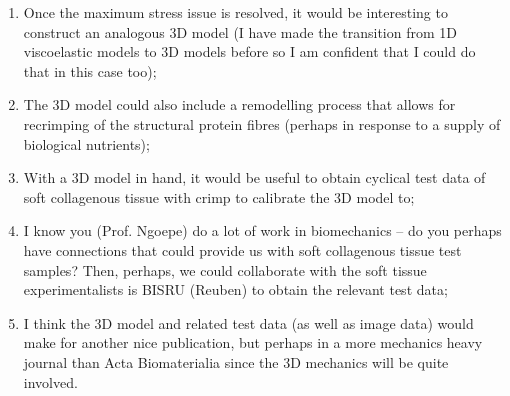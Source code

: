 \documentclass{article}
\begin{document}
\begin{enumerate}
	\item Once the maximum stress issue is resolved, it would be interesting to construct an analogous 3D model (I have made the transition from 1D viscoelastic models to 3D models before so I am confident that I could do that in this case too);
	\item The 3D model could also include a remodelling process that allows for recrimping of the structural protein fibres (perhaps in response to a supply of biological nutrients);
	\item With a 3D model in hand, it would be useful to obtain cyclical test data of soft collagenous tissue with crimp to calibrate the 3D model to;
	\item I know you (Prof. Ngoepe) do a lot of work in biomechanics -- do you perhaps have connections that could provide us with soft collagenous tissue test samples? Then, perhaps, we could collaborate with the soft tissue experimentalists is BISRU (Reuben) to obtain the relevant test data;
	\item I think the 3D model and related test data (as well as image data) would make for another nice publication, but perhaps in a more mechanics heavy journal than Acta Biomaterialia since the 3D mechanics will be quite involved.
\end{enumerate}

	\printbibliography
\end{document}
